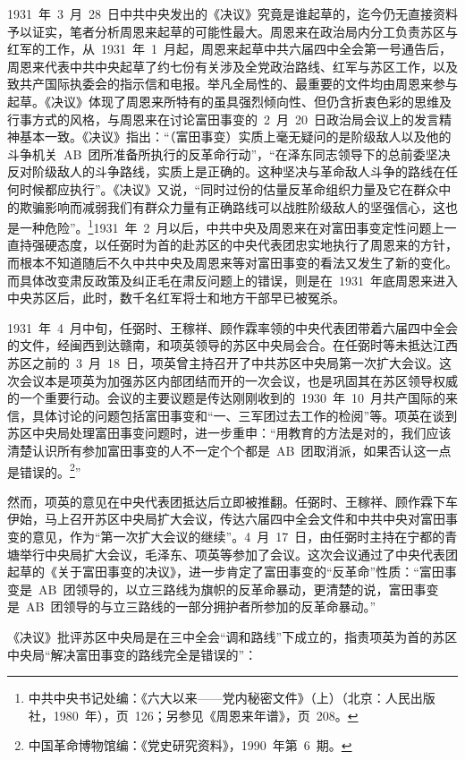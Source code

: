 1931~年~3~月~28~日中共中央发出的《决议》究竟是谁起草的，迄今仍无直接资料予以证实，笔者分析周恩来起草的可能性最大。周恩来在政治局内分工负责苏区与红军的工作，从~1931~年~1~月起，周恩来起草中共六届四中全会第一号通告后，周恩来代表中共中央起草了约七份有关涉及全党政治路线、红军与苏区工作，以及致共产国际执委会的指示信和电报。举凡全局性的、最重要的文件均由周恩来参与起草。《决议》体现了周恩来所特有的虽具强烈倾向性、但仍含折衷色彩的思维及行事方式的风格，与周恩来在讨论富田事变的~2~月~20~日政治局会议上的发言精神基本一致。《决议》指出：“（富田事变）实质上毫无疑问的是阶级敌人以及他的斗争机关~AB~团所准备所执行的反革命行动”，“在泽东同志领导下的总前委坚决反对阶级敌人的斗争路线，实质上是正确的。这种坚决与革命敌人斗争的路线在任何时候都应执行”。《决议》又说，“同时过份的估量反革命组织力量及它在群众中的欺骗影响而减弱我们有群众力量有正确路线可以战胜阶级敌人的坚强信心，这也是一种危险”。\footnote{中共中央书记处编：《六大以来——党内秘密文件》（上）（北京：人民出版社，1980~年），页~126；另参见《周恩来年谱》，页~208。}1931~年~2~月以后，中共中央及周恩来在对富田事变定性问题上一直持强硬态度，以任弼时为首的赴苏区的中央代表团忠实地执行了周恩来的方针，而根本不知道随后不久中共中央及周恩来等对富田事变的看法又发生了新的变化。而具体改变肃反政策及纠正毛在肃反问题上的错误，则是在~1931~年底周恩来进入中央苏区后，此时，数千名红军将士和地方干部早已被冤杀。

1931~年~4~月中旬，任弼时、王稼祥、顾作霖率领的中央代表团带着六届四中全会的文件，经闽西到达赣南，和项英领导的苏区中央局会合。在任弼时等未抵达江西苏区之前的~3~月~18~日，项英曾主持召开了中共苏区中央局第一次扩大会议。这次会议本是项英为加强苏区内部团结而开的一次会议，也是巩固其在苏区领导权威的一个重要行动。会议的主要议题是传达刚刚收到的~1930~年~10~月共产国际的来信，具体讨论的问题包括富田事变和“一、三军团过去工作的检阅”等。项英在谈到苏区中央局处理富田事变问题时，进一步重申：“用教育的方法是对的，我们应该清楚认识所有参加富田事变的人不一定个个都是~AB~团取消派，如果否认这一点是错误的。\footnote{中国革命博物馆编：《党史研究资料》，1990~年第~6~期。}”

然而，项英的意见在中央代表团抵达后立即被推翻。任弼时、王稼祥、顾作霖下车伊始，马上召开苏区中央局扩大会议，传达六届四中全会文件和中共中央对富田事变的意见，作为“第一次扩大会议的继续”。4~月~17~日，由任弼时主持在宁都的青塘举行中央局扩大会议，毛泽东、项英等参加了会议。这次会议通过了中央代表团起草的《关于富田事变的决议》，进一步肯定了富田事变的“反革命”性质：“富田事变是~AB~团领导的，以立三路线为旗帜的反革命暴动，更清楚的说，富田事变是~AB~团领导的与立三路线的一部分拥护者所参加的反革命暴动。”

《决议》批评苏区中央局是在三中全会“调和路线”下成立的，指责项英为首的苏区中央局“解决富田事变的路线完全是错误的”：

